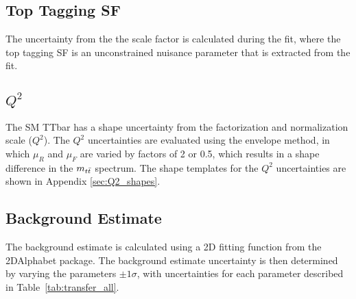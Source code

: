 \subsection{Top Tagging SF }

The uncertainty from the the scale factor is calculated during the fit, where the top tagging SF is an unconstrained nuisance parameter that is extracted from the fit.



\subsection{$Q^2$ }
The SM TTbar has a shape uncertainty from the factorization and normalization scale ($Q^2$). The $Q^2$ uncertainties are evaluated using the envelope method, in which $\mu_R$ and $\mu_F$ are varied by factors of 2 or 0.5, which results in a shape difference in the $m_{t\bar{t}}$ spectrum.  The shape templates for the $Q^2$ uncertainties are shown in Appendix \ref{sec:Q2_shapes}.







\subsection{Background Estimate} \label{section:BKGunc}

The background estimate is calculated using a 2D fitting function from the 2DAlphabet package. The background estimate uncertainty is then determined by varying the parameters $\pm 1 \sigma$, with uncertainties for each parameter described in Table~\ref{tab:transfer_all}.

